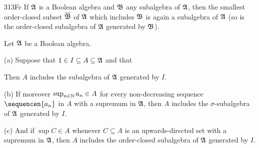 \spheader 313Fc If $\frak A$ is a Boolean algebra and $\frak B$ any
subalgebra
of $\frak A$, then the smallest order-closed subset $\overline{\frak B}$
of $\frak A$ which includes $\frak B$ is again a subalgebra of $\frak A$
(so is the order-closed subalgebra of $\frak A$ generated by $\frak B$).

 Let $\frak A$ be a Boolean algebra.

(a) Suppose that $1\in I\subseteq A\subseteq\frak A$ and that



\noindent Then $A$ includes the subalgebra of $\frak A$ generated by
$I$.

(b) If moreover $\sup_{n\in\Bbb N}a_n\in A$ for every non-decreasing
sequence $\sequencen{a_n}$ in $A$ with a supremum in $\frak A$, then $A$
includes the $\sigma$-subalgebra of $\frak A$ generated by $I$.

(c) And if $\sup C\in A$ whenever $C\subseteq A$ is an upwards-directed
set with a supremum in $\frak A$, then $A$ includes the order-closed
subalgebra of $\frak A$ generated by $I$.

